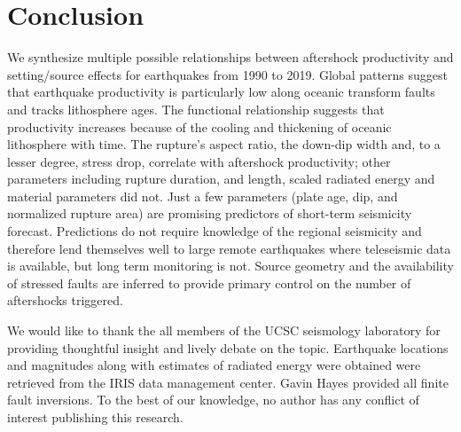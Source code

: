 \documentclass[draft]{agujournal2018}
\begin{document}
\section{Conclusion}

We synthesize multiple possible relationships between aftershock productivity and setting/source effects for earthquakes from 1990 to 2019. Global patterns suggest that earthquake productivity is particularly low along oceanic transform faults and tracks lithosphere ages. The functional relationship suggests that productivity increases because of the cooling and thickening of oceanic lithosphere with time. The rupture's aspect ratio, the down-dip width and, to a lesser degree, stress drop, correlate with aftershock productivity; other parameters including rupture duration, and length, scaled radiated energy and material parameters did not. Just a few parameters (plate age, dip, and normalized rupture area) are promising predictors of short-term seismicity forecast. Predictions do not require knowledge of the regional seismicity and therefore lend themselves well to large remote earthquakes where teleseismic data is available, but long term monitoring is not. Source geometry and the availability of stressed faults are inferred to provide primary control on the number of aftershocks triggered.

\acknowledgments
We would like to thank the all members of the UCSC seismology laboratory for providing thoughtful insight and lively debate on the topic. Earthquake locations and magnitudes along with estimates of radiated energy were obtained were retrieved from the IRIS data management center. Gavin Hayes provided all finite fault inversions. To the best of our knowledge, no author has any conflict of interest publishing this research.


\end{document}
